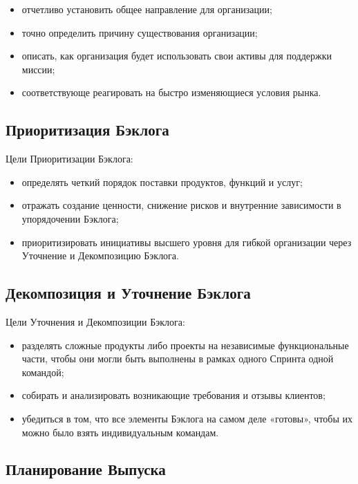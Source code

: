 \documentclass[12pt,a4paper,parskip=full]{scrartcl}
\begin{document}
\begin{itemize}
	\item отчетливо установить общее направление для организации;
	\item точно определить причину существования организации; 
	\item описать, как организация будет использовать свои активы для поддержки миссии;
	\item соответствующе реагировать на быстро изменяющиеся условия рынка. 
\end{itemize}

\subsection{Приоритизация Бэклога}

Цели Приоритизации Бэклога: 

\begin{itemize}
	\item определять четкий порядок поставки продуктов, функций и услуг;  
	\item отражать создание ценности, снижение  рисков  и внутренние зависимости в упорядочении Бэклога;
	\item приоритизировать инициативы высшего уровня для гибкой организации через Уточнение и Декомпозицию Бэклога. 
\end{itemize}

\subsection{Декомпозиция и Уточнение Бэклога}

Цели Уточнения и Декомпозиции Бэклога: 

\begin{itemize}
	\item разделять сложные продукты либо проекты на независимые функциональные части, чтобы они могли быть выполнены в рамках одного Спринта одной командой; 
	\item собирать и анализировать возникающие требования и отзывы клиентов; 
	\item убедиться в том, что все элементы Бэклога на самом деле «готовы», чтобы их можно было взять индивидуальным командам.
\end{itemize}

\subsection{Планирование Выпуска}
\end{document}
